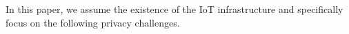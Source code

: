 In this paper, we assume the existence of the IoT infrastructure and specifically focus on the following privacy challenges.
%
%
%

